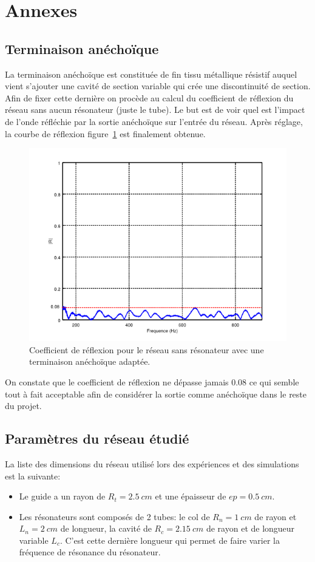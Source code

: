 \chapter*{Annexes}

\section*{Terminaison anéchoïque}
\label{term_anecho}
La terminaison anéchoïque est constituée de fin tissu métallique résistif auquel vient s'ajouter une cavité de section variable qui crée une discontinuité de section. Afin de fixer cette dernière on procède au calcul du coefficient de réflexion du réseau sans aucun résonateur (juste le tube). Le but est de voir quel est l'impact de l'onde réfléchie par la sortie anéchoïque sur l'entrée du réseau. Après réglage, la courbe de réflexion figure~\ref{fig_term_anecho} est finalement obtenue.

\begin{figure}[!h]
\centering
\includegraphics[scale=0.4]{./images_annexe/anecho.png}
\caption{\label{fig_term_anecho} Coefficient de réflexion pour le réseau sans résonateur avec une terminaison anéchoïque adaptée.}
\end{figure}

On constate que le coefficient de réflexion ne dépasse jamais 0.08 ce qui semble tout à fait acceptable afin de considérer la sortie comme anéchoïque dans le reste du projet.

\section*{Paramètres du réseau étudié}
\label{annexe_corr}
La liste des dimensions du réseau utilisé lors des expériences et des simulations est la suivante:
\begin{itemize}
\item Le guide a un rayon de $R_t = 2.5~cm$ et une épaisseur de $ep = 0.5~cm$.
\item Les résonateurs sont composés de 2 tubes: le col de $R_n = 1~cm$ de rayon et $L_n = 2~cm$ de longueur, la cavité de $R_c = 2.15~cm$ de rayon et de longueur variable $L_c$. C'est cette dernière longueur qui permet de faire varier la fréquence de résonance du résonateur. 
\end{itemize}


